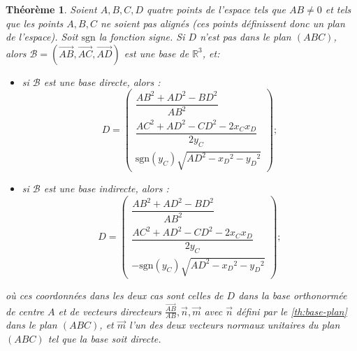 \documentclass[french, a4paper, 12pt, parskip]{scrartcl}
\newtheorem{theorem}{Théorème}
\begin{document}
\begin{theorem}
  Soient $A, B, C, D$ quatre points de l'espace tels que $AB\not=0$ et tels que
  les points $A, B, C$ ne soient pas alignés (ces points définissent donc un
  plan de l'espace). Soit $\mathrm{sgn}$ la fonction signe. Si $D$ n'est pas
  dans le plan $(ABC)$, alors $\mathcal{B}=\left(\overrightarrow{AB},
  \overrightarrow{AC}, \overrightarrow{AD}\right)$ est une base de
  $\mathbb{R}^3$, et:
  \begin{itemize}
    \item
      si $\mathcal{B}$ est une base directe, alors :
      \[
        D = \begin{pmatrix}
          \dfrac{{AB}^2 + {AD}^2 - {BD}^2}{{AB}^2} \\[4mm]
          \dfrac{{AC}^2 + {AD}^2 - {CD}^2 - 2x_Cx_D}{2y_C} \\[4mm]
          \mathrm{sgn}(y_C)\sqrt{{AD}^2 - {x_D}^2 - {y_D}^2}
        \end{pmatrix} ;
      \]
    \item
      si $\mathcal{B}$ est une base indirecte, alors :
      \[
        D = \begin{pmatrix}
          \dfrac{{AB}^2 + {AD}^2 - {BD}^2}{{AB}^2} \\[4mm]
          \dfrac{{AC}^2 + {AD}^2 - {CD}^2 - 2x_Cx_D}{2y_C} \\[4mm]
          - \mathrm{sgn}(y_C)\sqrt{{AD}^2 - {x_D}^2 - {y_D}^2}
        \end{pmatrix} ;
      \]
  \end{itemize}
  où ces coordonnées dans les deux cas sont celles de $D$ dans la base
  orthonormée de centre $A$ et de vecteurs directeurs
  $\frac{\overrightarrow{AB}}{AB}, \overrightarrow{n}, \overrightarrow{m}$ avec
  $\overrightarrow{n}$ défini par le \autoref{th:base-plan} dans le plan
  $(ABC)$, et $\overrightarrow{m}$ l'un des deux vecteurs normaux unitaires du
  plan $(ABC)$ tel que la base soit directe.

  \begin{center}
\end{center}
\end{theorem}
\end{document}
